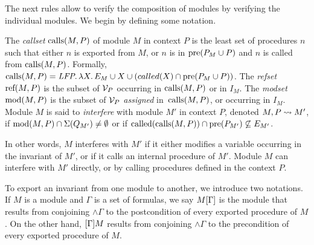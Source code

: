 The next rules allow to verify the composition of modules by verifying the individual modules.
We begin by defining some notation.

\begin{definition}
The \emph{callset} $\mbox{\rm calls}(M,P)$ of module $M$ in context $P$ is the least set of procedures $n$ such that either $n$ is exported from $M$, or $n$ is in $\mbox{\rm pre}(P_M \cup P)$ and $n$ is called from $\mbox{\rm calls}(M,P)$.
Formally, $\CallSet(M,P) = \textit{LFP}. \, \lambda X. \, E_M \cup X \cup (called(X) \cap \Domain(P_M \cup P))$.
The \emph{refset} $\mbox{\rm ref}(M,P)$ is
the subset of $\mathcal{V}_{P}$ occurring in $\mbox{\rm calls}(M,P)$ or in $I_M$.
The \emph{modset} $\mbox{\rm mod}(M,P)$ is the subset of $\mathcal{V}_{P}$ \emph{assigned} in~$\mbox{\rm calls}(M,P)$, or occurring in $I_M$.
%
Module $M$ is said to \emph{interfere} with module $M'$ in context $P$, denoted $M,P
\leadsto M'$, if $\mbox{\rm mod}(M,P) \cap {\ensuremath{\Sigma}}(Q_{M'}) \neq \emptyset$ or if $\mbox{\rm called}(\mbox{\rm calls}(M,P)) \cap \mbox{\rm pre}(P_{M'}) \not\subseteq E_{M'}$.
\end{definition}


In other words, $M$ interferes with $M'$ if it either modifies a
variable occurring in the invariant of $M'$, or if it calls an internal procedure of
$M'$. Module $M$ can interfere with $M'$ directly, or by calling
procedures defined in the context $P$.

To export an invariant from one module to another, we introduce two
notations.  If $M$ is a module and $\Gamma$ is a set of formulas, we
say $M[\Gamma]$ is the module that results from
conjoining $\wedge \Gamma$ to the postcondition of every exported procedure of $M$.
On the other hand, $[\Gamma]M$ results from conjoining $\wedge \Gamma$ to
the precondition of every exported procedure of $M$.

